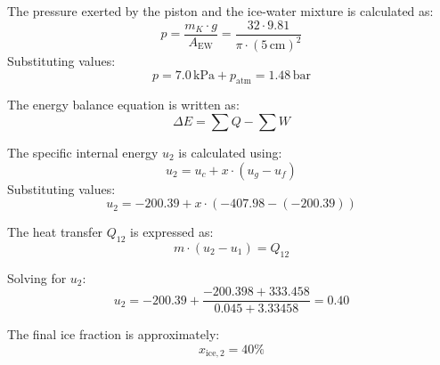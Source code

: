 The pressure exerted by the piston and the ice-water mixture is calculated as:  
\[
p = \frac{m_K \cdot g}{A_{\text{EW}}} = \frac{32 \cdot 9.81}{\pi \cdot (5 \, \text{cm})^2}
\]  
Substituting values:  
\[
p = 7.0 \, \text{kPa} + p_{\text{atm}} = 1.48 \, \text{bar}
\]  

The energy balance equation is written as:  
\[
\Delta E = \sum Q - \sum W
\]  

The specific internal energy \( u_2 \) is calculated using:  
\[
u_2 = u_c + x \cdot (u_g - u_f)
\]  
Substituting values:  
\[
u_2 = -200.39 + x \cdot (-407.98 - (-200.39))
\]  

The heat transfer \( Q_{12} \) is expressed as:  
\[
m \cdot (u_2 - u_1) = Q_{12}
\]  

Solving for \( u_2 \):  
\[
u_2 = -200.39 + \frac{-200.398 + 333.458}{0.045 + 3.33458} = 0.40
\]  

The final ice fraction is approximately:  
\[
x_{\text{ice},2} = 40\%
\]